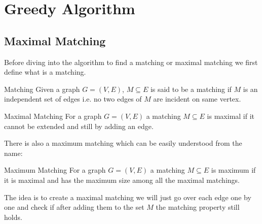 \chapter{Greedy Algorithm}

\section{Maximal Matching}\label{greedy:max-matching}

\begin{algoprob}
\end{algoprob}
Before diving into the algorithm to find a matching or maximal matching we first define what is a matching.
\begin{Definition}{Matching}{}
	Given a graph $G=(V,E)$, $M\subseteq E$ is said to be a matching if $M$ is an independent set of edges i.e. no two edges of $M$ are incident on same vertex.
\end{Definition}
\begin{Definition}{Maximal Matching}{}
	For a graph $G=(V,E)$ a matching $M\subseteq E$ is maximal if it cannot be extended and still by adding an edge.
\end{Definition}
There is also a maximum matching which can be easily understood from the name:
\begin{Definition}{Maximum Matching}{}
	For a graph $G=(V,E)$ a matching $M\subseteq E$ is maximum if it is maximal and has the maximum size among all the maximal matchings.
\end{Definition}

\begin{idea*}
	The idea is to create a maximal matching we will just go over each edge one by one and check if after adding them to the set $M$  the matching property still holds. 
\end{idea*}
\begin{algorithm}
	\DontPrintSemicolon
\caption{}
\end{algorithm}

